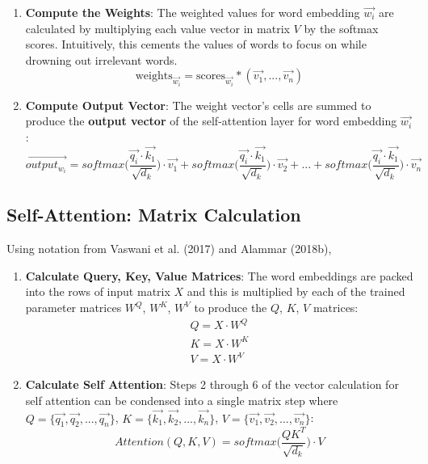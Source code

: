 \begin{enumerate}
    \item \textbf{Compute the Weights}: The weighted values for word embedding $\overrightarrow{w_i}$ are calculated by multiplying each value vector in matrix $V$ by the softmax scores. Intuitively, this cements the values of words to focus on while drowning out irrelevant words. 
    $$
    \text{weights}_{\overrightarrow{w_i}} = \text{scores}_{\overrightarrow{w_i}} * (\overrightarrow{v_1}, ..., \overrightarrow{v_n})
    $$

    \item \textbf{Compute Output Vector}: The weight vector's cells are summed to produce the \textbf{output vector} of the self-attention layer for word embedding $\overrightarrow{w_i}$: 
    $$
    \overrightarrow{output_{w_i}} = softmax \Bigg(
    \frac {\overrightarrow{q_i} \cdot \overrightarrow{k_1}} {\sqrt{d_k}} \Bigg) \cdot \overrightarrow{v_1} +
    softmax \Bigg(\frac {\overrightarrow{q_i} \cdot \overrightarrow{k_1}} {\sqrt{d_k}} \Bigg) \cdot \overrightarrow{v_2} + ... +
    softmax \Bigg(\frac {\overrightarrow{q_i} \cdot \overrightarrow{k_1}} {\sqrt{d_k}} \Bigg) \cdot \overrightarrow{v_n}
    $$
\end{enumerate} 


\subsection{Self-Attention: Matrix Calculation}

Using notation from Vaswani et al. (2017) and Alammar (2018b), 

\begin{enumerate}
    \item \textbf{Calculate Query, Key, Value Matrices}: The word embeddings are packed into the rows of input matrix $X$ and this is multiplied by each of the trained parameter matrices $W^Q$, $W^K$, $W^V$ to produce the $Q$, $K$, $V$ matrices:
    $$
    \begin{array}{ll}
    Q = X \cdot W^Q \\
    K = X \cdot W^K \\
    V = X \cdot W^V 
    \end{array}
    $$
    
    \item \textbf{Calculate Self Attention}: Steps 2 through 6 of the vector calculation for self attention can be condensed into a single matrix step where $Q = \Big\{\overrightarrow{q_1}, \overrightarrow{q_2}, ..., \overrightarrow{q_n} \Big\}$, $K = \Big\{\overrightarrow{k_1}, \overrightarrow{k_2}, ..., \overrightarrow{k_n} \Big\}$, $V = \Big\{\overrightarrow{v_1}, \overrightarrow{v_2}, ..., \overrightarrow{v_n} \Big\}$: 
    $$
    Attention(Q, K, V) = softmax \Bigg(\frac {QK^T} {\sqrt{d_k}} \Bigg) \cdot V
    $$
\end{enumerate}


